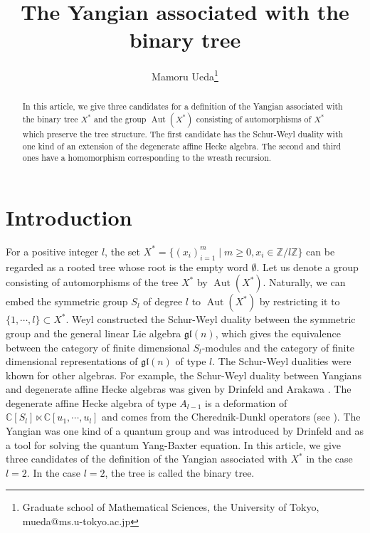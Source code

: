 \documentclass{article}
\theoremstyle{definition}
\theoremstyle{remark}
\numberwithin{equation}{section}
\DeclareMathOperator{\Aut}{Aut}
\numberwithin{equation}{section}
\begin{document}
\title{The Yangian associated with the binary tree}
\author{Mamoru Ueda\thanks{Graduate school of Mathematical Sciences, the University of Tokyo, mueda@ms.u-tokyo.ac.jp}}
\date{}

\maketitle

\begin{abstract}
In this article, we give three candidates for a definition of the Yangian associated with the binary tree $X^*$ and the group $\Aut(X^*)$ consisting of automorphisms of $X^*$ which preserve the tree structure. The first candidate has the Schur-Weyl duality with one kind of an extension of the degenerate affine Hecke algebra. The second and third ones have a homomorphism corresponding to the wreath recursion.
\end{abstract}

\section{Introduction}
For a positive integer $l$, the set $X^*=\{(x_i)_{i=1}^m\mid m\geq0,x_i\in\mathbb{Z}/l\mathbb{Z}\}$ can be regarded as a rooted tree whose root is the empty word $\emptyset$. Let us denote a group consisting of automorphisms of the tree $X^*$ by $\Aut(X^*)$.  Naturally, we can embed the symmetric group $S_l$ of degree $l$ to $\Aut(X^*)$ by restricting it to $\{1,\cdots,l\}\subset X^*$. Weyl constructed the Schur-Weyl duality between the symmetric group and the general linear Lie algebra $\mathfrak{gl}(n)$, which gives the equivalence between the category of finite dimensional $S_l$-modules and the category of finite dimensional representations of $\mathfrak{gl}(n)$ of type $l$. The Schur-Weyl dualities were khown for other algebras. For example, the Schur-Weyl duality between Yangians and degenerate affine Hecke algebras was given by Drinfeld \cite{Dri} and Arakawa \cite{ara}. The degenerate affine Hecke algebra of type $A_{l-1}$ is a deformation of $\mathbb{C}[S_l]\ltimes\mathbb{C}[u_1,\cdots,u_l]$ and comes from the Cherednik-Dunkl operators (see \cite{Ch}). The Yangian was one kind of a quantum group and was introduced by Drinfeld \cite{D1} and \cite{D2} as a tool for solving the quantum Yang-Baxter equation. In this article, we give three candidates of the definition of the Yangian associated with $X^*$ in the case $l=2$. In the case $l=2$, the tree is called the binary tree.
\end{document}
